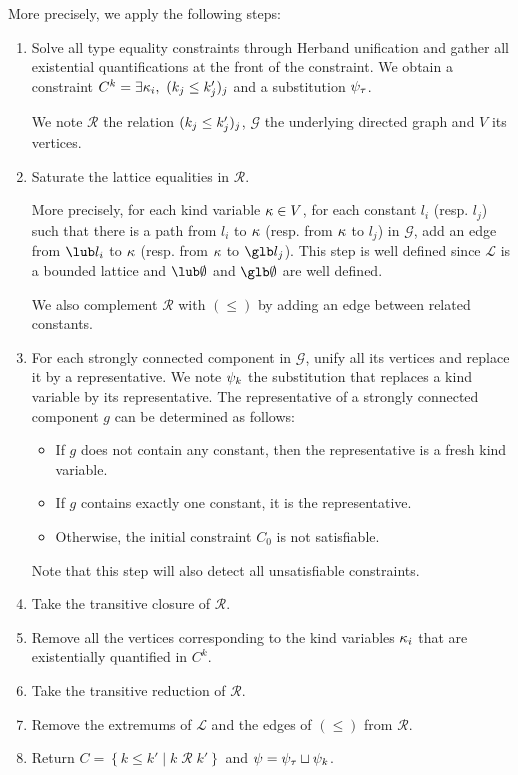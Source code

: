 More precisely, we apply the following steps:
\begin{enumerate}
\item Solve all type equality constraints through Herband unification and
  gather all existential quantifications at the front of the constraint.
  We obtain a constraint $C^k = \exists \kappa_i,\ (k_j \leq k'_j)_j$ and
  a substitution $\mathrm{\psi}_\tau$.
  
  We note $\mathcal R$ the relation $(k_j \leq k'_j)_j$,
  $\mathcal G$ the underlying directed graph and $V$ its vertices.

\item Saturate the lattice equalities in $\mathcal R$.
  
  More precisely, for each kind variable $\kappa \in V$,
  for each constant $l_i$ (resp. $l_j$) such that
  there is a path from $l_i$ to $\kappa$ (resp. from $\kappa$ to $l_j$) in $\mathcal G$,
  add an edge from $\lub l_i$ to $\kappa$
  (resp. from $\kappa$ to $\glb l_j$).
  This step is well defined since $\mathcal L$ is a bounded lattice
  and $\lub\emptyset$ and $\glb\emptyset$ are well defined.

  We also complement $\mathcal R$ with $(\leq)$ by adding an edge
  between related constants.
\item For each strongly connected component in $\mathcal G$, unify all its vertices and replace it by a representative.
  We note $\mathrm{\psi}_k$ the substitution that replaces a kind variable by
  its representative.
  The representative of a strongly connected component $g$ can be determined as follows:
  \begin{itemize}
  \item If $g$ does not contain any constant, then the representative
    is a fresh kind variable.
  \item If $g$ contains exactly one constant, it is the representative.
  \item Otherwise, the initial constraint $C_0$ is not satisfiable.
  \end{itemize}
  Note that this step will also detect all unsatisfiable constraints.
\item Take the transitive closure of $\mathcal R$.
\item Remove all the vertices corresponding to the kind variables $\kappa_i$
  that are existentially quantified in $C^k$.
\item Take the transitive reduction of $\mathcal R$.
\item Remove the extremums of $\mathcal L$ and the edges of $(\leq)$
  from $\mathcal R$.
\item Return $C = \left\{ k \leq k' \mid k \operatorname{\mathcal R}k' \right\}$
  and $\mathrm{\psi} =  \mathrm{\psi}_\tau \sqcup \mathrm{\psi}_k$.
\end{enumerate}

